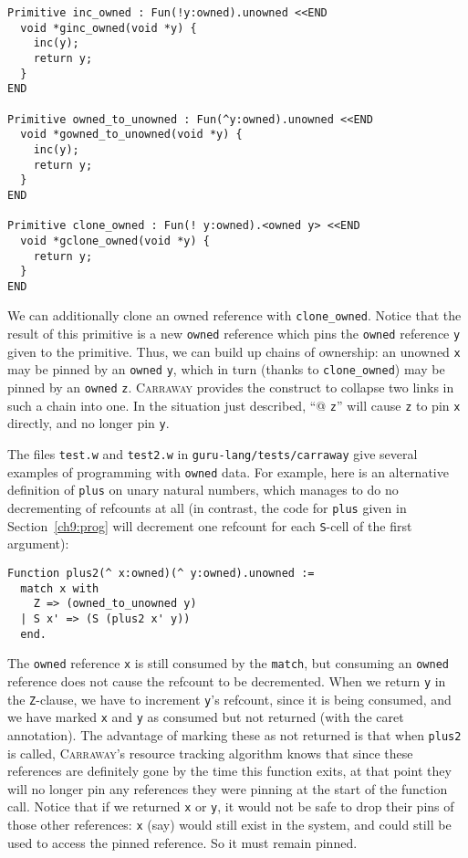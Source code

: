 \documentclass{book}[12pt]
\newcommand{\carraway}[0]{\textsc{Carraway}\xspace}
\begin{document}
\begin{verbatim}
Primitive inc_owned : Fun(!y:owned).unowned <<END
  void *ginc_owned(void *y) {
    inc(y);
    return y;
  }
END

Primitive owned_to_unowned : Fun(^y:owned).unowned <<END
  void *gowned_to_unowned(void *y) {
    inc(y);
    return y;
  }
END

Primitive clone_owned : Fun(! y:owned).<owned y> <<END
  void *gclone_owned(void *y) {
    return y;
  }
END
\end{verbatim}

\noindent 
We can additionally clone an owned reference with
\texttt{clone\_owned}.  Notice that the result of this primitive is a
new \texttt{owned} reference which pins the \texttt{owned} reference
\texttt{y} given to the primitive.  Thus, we can build up chains of
ownership: an unowned \texttt{x} may be pinned by an \texttt{owned}
\texttt{y}, which in turn (thanks to \texttt{clone\_owned}) may be
pinned by an \texttt{owned} \texttt{z}.  \carraway provides the \@
construct to collapse two links in such a chain into one.  In the
situation just described, ``@ \texttt{z}'' will cause \texttt{z} to
pin \texttt{x} directly, and no longer pin \texttt{y}.

The files \texttt{test.w} and \texttt{test2.w} in
\texttt{guru-lang/tests/carraway} give several examples of programming
with \texttt{owned} data.  For example, here is an alternative
definition of \texttt{plus} on unary natural numbers, which manages to
do no decrementing of refcounts at all (in contrast, the code for
\texttt{plus} given in Section~\ref{ch9:prog} will decrement one
refcount for each \texttt{S}-cell of the first argument):

\begin{verbatim}
Function plus2(^ x:owned)(^ y:owned).unowned :=
  match x with
    Z => (owned_to_unowned y)
  | S x' => (S (plus2 x' y))
  end.
\end{verbatim}

\noindent The \texttt{owned} reference \texttt{x} is still consumed by
the \texttt{match}, but consuming an \texttt{owned} reference does not
cause the refcount to be decremented.  When we return \texttt{y} in
the \texttt{Z}-clause, we have to increment \texttt{y}'s refcount,
since it is being consumed, and we have marked \texttt{x} and
\texttt{y} as consumed but not returned (with the caret annotation).
The advantage of marking these as not returned is that when
\texttt{plus2} is called, \carraway's resource tracking algorithm
knows that since these references are definitely gone by the time this
function exits, at that point they will no longer pin any references
they were pinning at the start of the function call.  Notice that if
we returned \texttt{x} or \texttt{y}, it would not be safe to drop
their pins of those other references: \texttt{x} (say) would still
exist in the system, and could still be used to access the pinned
reference.  So it must remain pinned.
\end{document}
